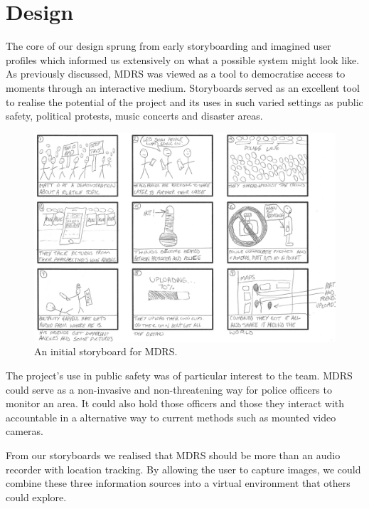 \documentclass{l3proj}
\begin{document}
\chapter{Design}
\label{design}

The core of our design sprung from early storyboarding and imagined user
profiles which informed us extensively on what a possible system might look
like. As previously discussed, MDRS was viewed as a tool to democratise access to moments through an interactive medium. Storyboards served as an excellent tool to realise the potential of the project and its uses in such varied settings as public safety, political protests, music concerts and disaster areas.

\begin{figure}[ht!]
\centering
\includegraphics[width=1\textwidth]{images/ally-storyboard.jpg}
\caption{An initial storyboard for MDRS.}
\end{figure}

The project's use in public safety was of particular interest to the team. MDRS could serve as a non-invasive and non-threatening way for police officers to monitor an area. It could also hold those officers and those they interact with accountable in a alternative way to current methods such as mounted video cameras.

From our storyboards we realised that MDRS should be more than an audio recorder with location tracking. By allowing the user to capture images, we could combine these three information sources into a virtual environment that others could explore.
\end{document}
